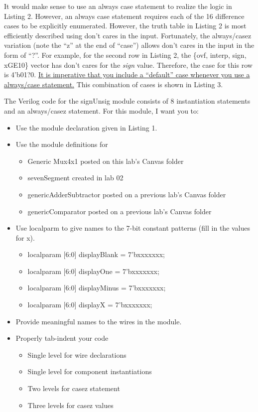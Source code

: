 It would make sense to use an always case statement to realize the logic
in Listing 2. However, an always case statement requires each of the 16
difference cases to be explicitly enumerated. However, the truth table
in Listing 2 is most efficiently described using don't cares in the
input. Fortunately, the always/casez variation (note the ``z'' at the
end of ``case'') allows don't cares in the input in the form of ``?''.
For example, for the second row in Listing 2, the \{ovf, interp, sign,
xGE10\} vector has don't cares for the \emph{sign} value. Therefore, the
case for this row is 4'b01?0. \uline{It is imperative that you include a
``default'' case whenever you use a always/case statement.} This
combination of cases is shown in Listing 3.

\protect\hypertarget{sigUnsign_Verilog}{}{}The Verilog code for the
signUnsig module consists of 8 instantiation statements and an
always/casez statement. For this module, I want you to:

\begin{itemize}
\item
  Use the module declaration given in Listing 1.
\item
  Use the module definitions for

  \begin{itemize}
  \item
    Generic Mux4x1 posted on this lab's Canvas folder
  \item
    sevenSegment created in lab 02
  \item
    genericAdderSubtractor posted on a previous lab's Canvas folder
  \item
    genericComparator posted on a previous lab's Canvas folder
  \end{itemize}
\item
  Use localparm to give names to the 7-bit constant patterns (fill in
  the values for x).

  \begin{itemize}
  \item
    localparam {[}6:0{]} displayBlank = 7'bxxxxxxx;
  \item
    localparam {[}6:0{]} displayOne = 7'bxxxxxxx;
  \item
    localparam {[}6:0{]} displayMinus = 7'bxxxxxxx;
  \item
    localparam {[}6:0{]} displayX = 7'bxxxxxxx;
  \end{itemize}
\item
  Provide meaningful names to the wires in the module.
\item
  Properly tab-indent your code

  \begin{itemize}
  \item
    Single level for wire declarations
  \item
    Single level for component instantiations
  \item
    Two levels for casez statement
  \item
    Three levels for casez values
  \end{itemize}
\end{itemize}

